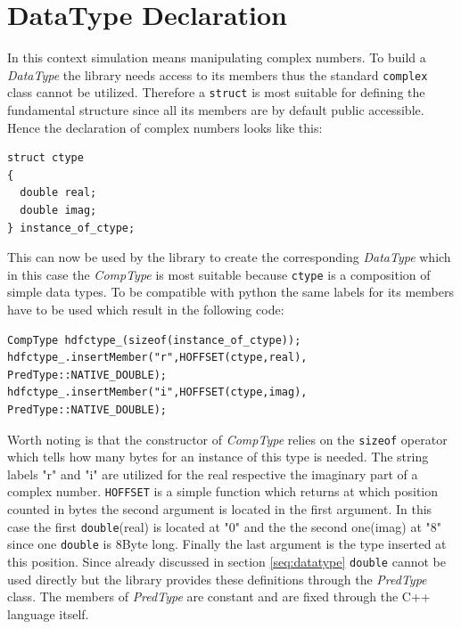\section{DataType Declaration}
\label{seq:datatypedec}
In this context simulation means manipulating complex numbers. To build a \textit{DataType} the library needs access to its members thus the standard \texttt{complex} class cannot be utilized. Therefore a \texttt{struct} is most suitable for defining the fundamental structure since all its members are by default public accessible. Hence the declaration of complex numbers looks like this:
\begin{lstlisting}
struct ctype
{
  double real;
  double imag;
} instance_of_ctype;
\end{lstlisting}
This can now be used by the library to create the corresponding \textit{DataType} which in this case the \textit{CompType} is most suitable because \texttt{ctype} is a composition of simple data types. To be compatible with python the same labels for its members have to be used which result in the following code:
\begin{lstlisting}
CompType hdfctype_(sizeof(instance_of_ctype));
hdfctype_.insertMember("r",HOFFSET(ctype,real), PredType::NATIVE_DOUBLE);
hdfctype_.insertMember("i",HOFFSET(ctype,imag), PredType::NATIVE_DOUBLE);
\end{lstlisting}
Worth noting is that the constructor of \textit{CompType} relies on the \texttt{sizeof} operator which tells how many bytes for an instance of this type is needed. The string labels "r" and "i" are utilized for the real respective the imaginary part of a complex number. \texttt{HOFFSET} is a simple function which returns at which position counted in bytes the second argument is located in the first argument. In this case the first \texttt{double}(real) is located at "0" and the the second one(imag) at "8" since one \texttt{double} is $8$Byte long. Finally the last argument is the type inserted at this position. Since already discussed in section \ref{seq:datatype} \texttt{double} cannot be used directly but the library provides these definitions through the \textit{PredType} class. The members of \textit{PredType} are constant and are fixed through the C++ language itself.\\

